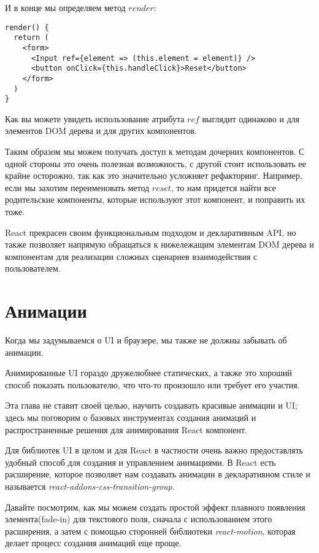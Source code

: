 И в конце мы определяем метод $render$:

\begin{lstlisting}
render() {
  return (
    <form>
      <Input ref={element => (this.element = element)} />
      <button onClick={this.handleClick}>Reset</button>
    </form>
  )
}
\end{lstlisting}

Как вы можете увидеть использование атрибута $ref$ выглядит одинаково и для элементов DOM дерева и для других компонентов.

Таким образом мы можем получать доступ к методам дочерних компонентов. С одной стороны это очень полезная возможность, с другой стоит использовать ее крайне осторожно, так как это значительно усложняет рефакторинг. Например, если мы захотим переименовать метод $reset$, то нам придется найти все родительские компоненты, которые используют этот компонент, и поправить их тоже.

React прекрасен своим функциональным подходом и декларативным API, но также позволяет напрямую обращаться к нижележащим элементам DOM дерева и компонентам для реализации сложных сценариев взаимодействия с пользователем.

\section{Анимации}

Когда мы задумываемся о UI и браузере, мы также не должны забывать об анимации.

Анимированные UI гораздо дружелюбнее статических, а также это хороший способ показать пользователю, что что-то произошло или требует его участия.

Эта глава не ставит своей целью, научить создавать красивые анимации и UI; здесь мы поговорим о базовых инструментах создания анимаций и распространенные решения для анимирования React компонент. 

Для библиотек UI в целом и для React в частности очень важно предоставлять удобный способ для создания и управлением анимациями. В React есть расширение, которое позволяет нам создавать анимации в декларативном стиле и называется \textit{react-addons-css-transition-group}. 

Давайте посмотрим, как мы можем создать простой эффект плавного появления элемента(fade-in) для текстового поля, сначала с использованием этого расширения, а затем с помощью сторонней библиотеки \textit{react-motion}, которая делает процесс создания анимаций еще проще.

